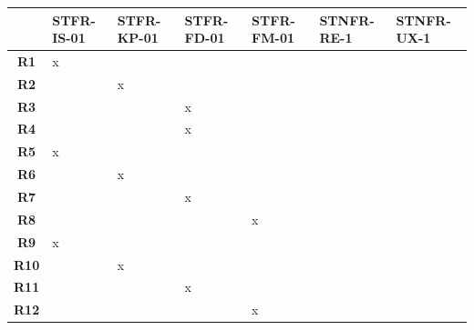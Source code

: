 \documentclass[12pt, titlepage]{article}
\begin{document}
\begin{table}[h!]
  \centering
  \begin{tabularx}{\textwidth}{|c|X|X|X|X|X|X|}
  \hline
  \textbf{}     & \textbf{STFR-IS-01} & \textbf{STFR-KP-01} & \textbf{STFR-FD-01} & \textbf{STFR-FM-01} & \textbf{STNFR-RE-1} & \textbf{STNFR-UX-1} \\ \hline
  \textbf{R1}   & x                   &                     &                     &                     &                     &                     \\ \hline
  \textbf{R2}   &                     & x                   &                     &                     &                     &                     \\ \hline
  \textbf{R3}   &                     &                     & x                   &                     &                     &                     \\ \hline
  \textbf{R4}   &                     &                     & x                   &                     &                     &                     \\ \hline
  \textbf{R5}   & x                   &                     &                     &                     &                     &                     \\ \hline
  \textbf{R6}   &                     & x                   &                     &                     &                     &                     \\ \hline
  \textbf{R7}   &                     &                     & x                   &                     &                     &                     \\ \hline
  \textbf{R8}   &                     &                     &                     & x                   &                     &                     \\ \hline
  \textbf{R9}   & x                   &                     &                     &                     &                     &                     \\ \hline
  \textbf{R10}  &                     & x                   &                     &                     &                     &                     \\ \hline
  \textbf{R11}  &                     &                     & x                   &                     &                     &                     \\ \hline
  \textbf{R12}  &                     &                     &                     & x                   &                     &                     \\ \hline

\end{tabularx}
\end{table}
\end{document}

